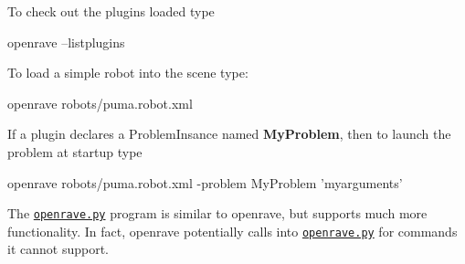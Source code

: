 To check out the plugins loaded type \begin{DoxyVerb}
openrave --listplugins
\end{DoxyVerb}


To load a simple robot into the scene type: \begin{DoxyVerb}
openrave robots/puma.robot.xml
\end{DoxyVerb}


If a plugin declares a ProblemInsance named {\bfseries MyProblem}, then to launch the problem at startup type \begin{DoxyVerb}
openrave robots/puma.robot.xml -problem MyProblem 'myarguments'
\end{DoxyVerb}


The \href{http://openrave.org/en/main/command_line_tools.html#openrave-py}{\tt openrave.py} program is similar to {\ttfamily openrave}, but supports much more functionality. In fact, {\ttfamily openrave} potentially calls into \href{http://openrave.org/en/main/command_line_tools.html#openrave-py}{\tt openrave.py} for commands it cannot support. 